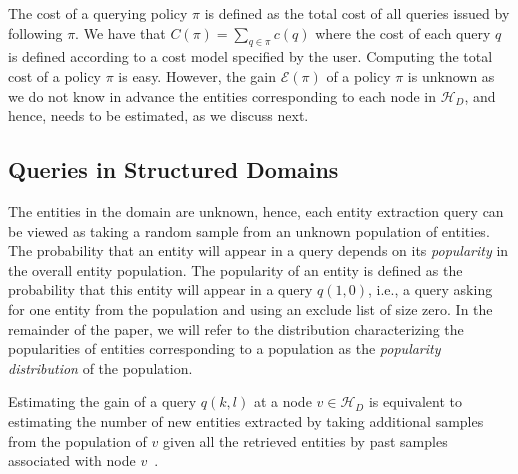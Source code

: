 \documentclass{vldb}
\newcommand{\hierarchy}{\mathcal{H}_D}
\newcommand{\uentities}{\mathcal{E}}
\begin{document}
The cost of a querying policy $\pi$ is defined as the total cost of all queries issued by following $\pi$. We have that $C(\pi) = \sum_{q \in \pi} c(q)$ where the cost of each query $q$ is defined according to a cost model specified by the user. Computing the total cost of a policy $\pi$ is easy. However, the gain $\uentities(\pi)$ of a policy $\pi$ is unknown as we do not know in advance the entities corresponding to each node in $\hierarchy$, and hence, needs to be estimated, as we discuss next. 

\subsection{Queries in Structured Domains}
\label{sec:sampling}
The entities in the domain are unknown, hence, each entity extraction query can be viewed as taking a random sample from an unknown population of entities. The probability that an entity will appear in a query depends on its {\em popularity} in the overall entity population. The popularity of an entity is defined as the probability that this entity will appear in a query $q(1,0)$, i.e., a query asking for one entity from the population and using an exclude list of size zero. In the remainder of the paper, we will refer to the distribution characterizing the popularities of entities corresponding to a population as the {\em popularity distribution} of the population. 

Estimating the gain of a query $q(k,l)$ at a node $v \in \hierarchy$ is equivalent to estimating the number of new entities extracted by taking additional samples from the population of $v$ given all the retrieved entities by past samples associated with node $v$~\cite{trushkowsky:2013}. 
\end{document}
